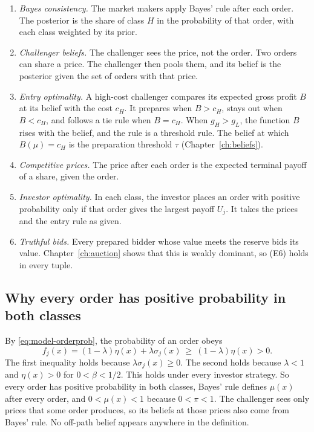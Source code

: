 \begin{enumerate}[label=(E\arabic*),leftmargin=3em]
\item \emph{Bayes consistency.} The market makers apply Bayes' rule after each order. The posterior is the share of class \(H\) in the probability of that order, with each class weighted by its prior.
\item \emph{Challenger beliefs.} The challenger sees the price, not the order. Two orders can share a price. The challenger then pools them, and its belief is the posterior given the set of orders with that price.
\item \emph{Entry optimality.} A high-cost challenger compares its expected gross profit \(B\) at its belief with the cost \(c_H\). It prepares when \(B>c_H\), stays out when \(B<c_H\), and follows a tie rule when \(B=c_H\). When \(g_H>g_L\), the function \(B\) rises with the belief, and the rule is a threshold rule. The belief at which \(B(\mu)=c_H\) is the preparation threshold \(\tau\) (Chapter~\ref{ch:beliefs}).
\item \emph{Competitive prices.} The price after each order is the expected terminal payoff of a share, given the order.
\item \emph{Investor optimality.} In each class, the investor places an order with positive probability only if that order gives the largest payoff \(U_j\). It takes the prices and the entry rule as given.
\item \emph{Truthful bids.} Every prepared bidder whose value meets the reserve bids its value. Chapter~\ref{ch:auction} shows that this is weakly dominant, so (E6) holds in every tuple.
\end{enumerate}

\subsection*{Why every order has positive probability in both classes}

By \eqref{eq:model-orderprob}, the probability of an order obeys
\[
f_j(x)=(1-\lambda)\eta(x)+\lambda\sigma_j(x)\ \ge\ (1-\lambda)\eta(x)>0.
\]
The first inequality holds because \(\lambda\sigma_j(x)\ge0\).
The second holds because \(\lambda<1\) and \(\eta(x)>0\) for \(0<\beta<1/2\).
This holds under every investor strategy.
So every order has positive probability in both classes, Bayes' rule defines \(\mu(x)\) after every order, and \(0<\mu(x)<1\) because \(0<\pi<1\).
The challenger sees only prices that some order produces, so its beliefs at those prices also come from Bayes' rule.
No off-path belief appears anywhere in the definition.

